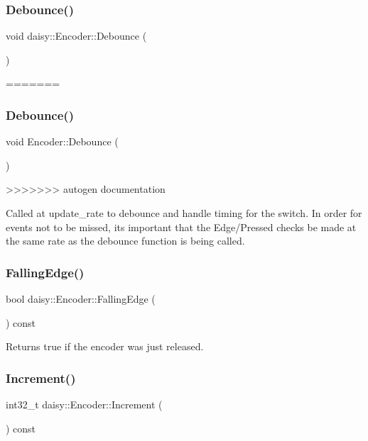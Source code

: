 \subsubsection{\texorpdfstring{Debounce()}{Debounce()}}
{\footnotesize\ttfamily void daisy\+::\+Encoder\+::\+Debounce (\begin{DoxyParamCaption}{ }\end{DoxyParamCaption})}
=======
\mbox{\label{classdaisy_1_1_encoder_af07f408ac0225fbf124cce607ca4fb6b}} 
\subsubsection{\texorpdfstring{Debounce()}{Debounce()}}
{\footnotesize\ttfamily void Encoder\+::\+Debounce (\begin{DoxyParamCaption}{ }\end{DoxyParamCaption})}
>>>>>>> autogen documentation

Called at update\+\_\+rate to debounce and handle timing for the switch. In order for events not to be missed, its important that the Edge/\+Pressed checks be made at the same rate as the debounce function is being called. \mbox{\label{classdaisy_1_1_encoder_aaf89f3fee67ab4866b08be0616bba978}} 
\subsubsection{\texorpdfstring{Falling\+Edge()}{FallingEdge()}}
{\footnotesize\ttfamily bool daisy\+::\+Encoder\+::\+Falling\+Edge (\begin{DoxyParamCaption}{ }\end{DoxyParamCaption}) const\hspace{0.3cm}{\ttfamily [inline]}}

Returns true if the encoder was just released. \mbox{\label{classdaisy_1_1_encoder_ae0f2d9d22a006a45daa1ac9cbcba4050}} 
\subsubsection{\texorpdfstring{Increment()}{Increment()}}
{\footnotesize\ttfamily int32\+\_\+t daisy\+::\+Encoder\+::\+Increment (\begin{DoxyParamCaption}{ }\end{DoxyParamCaption}) const\hspace{0.3cm}{\ttfamily [inline]}}


